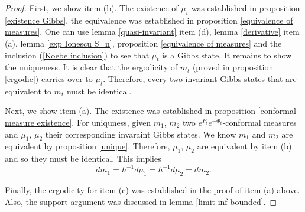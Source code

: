 \documentclass[12pt,reqno]{amsart}
\begin{document}
\begin{proof}
    First, we show item (b). The existence of $\mu_t$ was established in proposition \ref{existence Gibbs}, the equivalence was established in proposition \ref{equivalence of measures}. One can use lemma \ref{quasi-invariant} item (d), lemma \ref{derivative} item (a), lemma \ref{exp Ionescu S_n}, proposition \ref{equivalence of measures} and the inclusion (\ref{Koebe inclusion}) to see that $\mu_t$ is a Gibbs state. It remains to show the uniqueness. It is clear that the ergodicity of $m_t$ (proved in proposition \ref{ergodic}) carries over to $\mu_t$. Therefore, every two invariant Gibbs states that are equivalent to $m_t$ must be identical.

\noindent    Next, we show item (a). The existence was established in proposition \ref{conformal measure existence}. For uniquness, given $m_1$, $m_2$ two $e^{P_t}e^{-\Phi_t}$-conformal measures and $\mu_1$, $\mu_2$ their corresponding invaraint Gibbs states. We know $m_1$ and $m_2$ are equivalent by proposition \ref{unique}. Therefore, $\mu_1$, $\mu_2$ are equivalent by item (b) and so they must be identical. This implies 
    $$dm_1=h^{-1}d\mu_1=h^{-1}d\mu_2=dm_2.$$

\noindent    Finally, the ergodicity for item (c) was established in the proof of item (a) above. Also, the support argument was discussed in lemma \ref{limit inf bounded}.
\end{proof}




\end{document}
